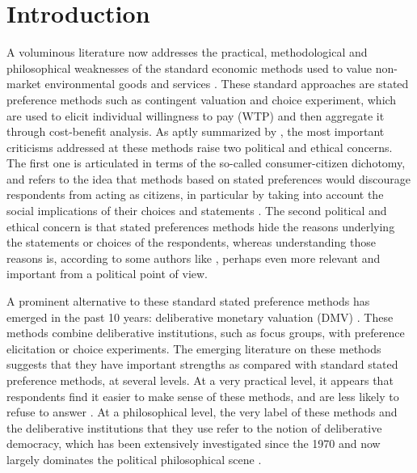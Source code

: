 \documentclass[version=3.21, pagesize, twoside=off, bibliography=totoc, DIV=calc, fontsize=12pt, a4paper, french, english]{scrartcl}
\begin{document}
\section{Introduction}
A voluminous literature now addresses the practical, methodological and philosophical weaknesses of the standard economic methods used to value non-market environmental goods and services \citep{meinard_ethical_2016}. 
These standard approaches are stated preference methods such as contingent valuation and choice experiment, which are used to elicit individual willingness to pay (WTP) and then aggregate it through cost-benefit analysis. 
As aptly summarized by \citet{bartkowski_beyond_2018}, the most important criticisms addressed at these methods raise two political and ethical concerns. 
The first one is articulated in terms of the so-called consumer-citizen dichotomy, and refers to the idea that methods based on stated preferences would discourage respondents from acting as citizens, in particular by taking into account the social implications of their choices and statements \citep{soma_representing_2014, vatn_institutional_2009}. 
The second political and ethical concern is that stated preferences methods hide the reasons underlying the statements or choices of the respondents, whereas understanding those reasons is, according to some authors like \citet{sen_environmental_1995}, perhaps even more relevant and important from a political point of view.

A prominent alternative to these standard stated preference methods has emerged in the past 10 years: deliberative monetary valuation (DMV) \citep{spash_deliberative_2007,bartkowski_economic_2017}. 
These methods combine deliberative institutions, such as focus groups, with preference elicitation or choice experiments. 
The emerging literature on these methods suggests that they have important strengths as compared with standard stated preference methods, at several levels. 
At a very practical level, it appears that respondents find it easier to make sense of these methods, and are less likely to refuse to answer \citep{lienhoop_contingent_2007,szabo_reducing_2011}. 
At a philosophical level, the very label of these methods and the deliberative institutions that they use refer to the notion of deliberative democracy, which has been extensively investigated since the 1970 and now largely dominates the political philosophical scene \citep{chappell_deliberative_2012}.
\end{document}
